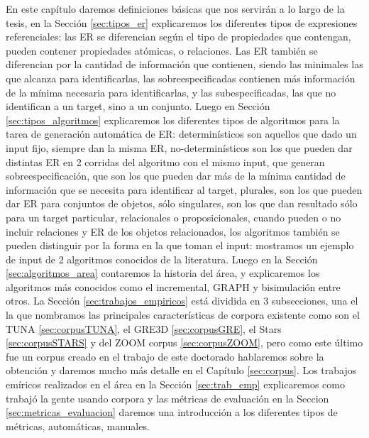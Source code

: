 En este cap\'itulo daremos definiciones b\'asicas que nos servir\'an a lo largo de la tesis, en la Secci\'on \ref{sec:tipos_er} explicaremos los diferentes tipos de expresiones referenciales: las ER se diferencian seg\'un el tipo de propiedades que contengan, pueden contener propiedades at\'omicas, o relaciones. Las ER tambi\'en se diferencian por la cantidad de informaci\'on que contienen, siendo las minimales las que alcanza para identificarlas, las sobreespecificadas contienen m\'as informaci\'on de la m\'inima necesaria para identificarlas, y las subespecificadas, las que no identifican a un target, sino a un conjunto.%
Luego en Secci\'on \ref{sec:tipos_algoritmos} explicaremos los diferentes tipos de algoritmos para la tarea de generaci\'on autom\'atica de ER: determin\'isticos son aquellos que dado un input fijo, siempre dan la misma ER, no-determin\'isticos son los que pueden dar distintas ER en 2 corridas del algoritmo con el mismo input, que generan sobreespecificaci\'on, que son los que pueden dar m\'as de la m\'inima cantidad de informaci\'on que se necesita para identificar al target, plurales, son los que pueden dar ER para conjuntos de objetos, s\'olo singulares, son los que dan resultado s\'olo para un target particular, relacionales o proposicionales, cuando pueden o no incluir relaciones y ER de los objetos relacionados, los algoritmos tambi\'en se pueden distinguir por la forma en la que toman el input: mostramos un ejemplo de input de 2 algoritmos conocidos de la literatura. Luego en la Secci\'on \ref{sec:algoritmos_area} contaremos la historia del \'area, y explicaremos los algoritmos m\'as conocidos como el incremental, GRAPH y bisimulaci\'on entre otros. La Secci\'on \ref{sec:trabajos_empiricos} est\'a dividida en 3 subsecciones, una el la que nombramos las principales caracter\'isticas de corpora existente como son el TUNA \ref{sec:corpusTUNA}, el GRE3D \ref{sec:corpusGRE}, el Stars \ref{sec:corpusSTARS} y del ZOOM corpus \ref{sec:corpusZOOM}, pero como este \'ultimo fue un corpus creado en el trabajo de este doctorado hablaremos sobre la obtenci\'on y daremos mucho m\'as detalle en el Cap\'itulo \ref{sec:corpus}. Los trabajos em\'iricos realizados en el \'area en la Secci\'on \ref{sec:trab_emp} explicaremos como trabaj\'o la gente usando corpora y las m\'etricas de evaluaci\'on en la Seccion \ref{sec:metricas_evaluacion} daremos una introducci\'on a los diferentes tipos de m\'etricas, autom\'aticas, manuales. 

